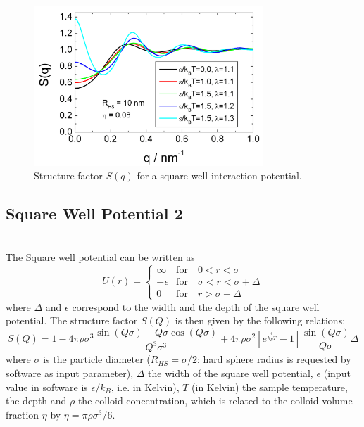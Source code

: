 \begin{figure}[htb]
\begin{center}
\includegraphics[width=0.768\textwidth,height=0.528\textwidth]{../images/structure_factor/HardSphere/SquareWellSQ.png}
\end{center}
\caption{Structure factor $S(q)$ for a square well interaction potential.}
\label{fig:SquareWell1}
\end{figure}


\clearpage
\subsection{Square Well Potential 2} ~\\

The Square well potential can be written as
\begin{equation}
U(r) =
 \begin{cases}
      \infty    & \text{for} \quad 0<r<\sigma \\
      -\epsilon & \text{for} \quad \sigma<r<\sigma+\Delta \\
      0         & \text{for} \quad r>\sigma+\Delta
   \end{cases}
\end{equation}
where $\Delta$ and $\epsilon$ correspond to the width and the
depth of the square well potential. The structure factor $S(Q)$ is
then given by the following relations:
\begin{equation}
S(Q)  = 1
-4\pi\rho\sigma^3\frac{\sin(Q\sigma)-Q\sigma\cos(Q\sigma)}{Q^3\sigma^3}
          +4\pi\rho\sigma^2\left[e^{\frac{\epsilon}{k_BT}}-1\right]\frac{\sin(Q\sigma)}{Q\sigma}
          \Delta
\end{equation}
where $\sigma$ is the particle diameter ($R_{HS} = \sigma/2$: hard
sphere radius is requested by software as input parameter),
$\Delta$ the width of the square well potential, $\epsilon$ (input
value in software is $\epsilon/k_B$, i.e. in Kelvin), $T$ (in
Kelvin) the sample temperature, the depth and $\rho$ the colloid
concentration, which is related to the colloid volume fraction
$\eta$ by $\eta=\pi\rho\sigma^3/6$.


